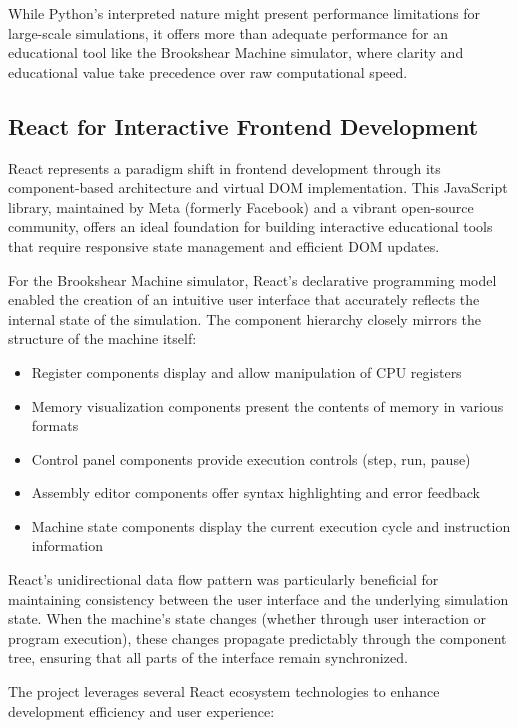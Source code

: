 While Python's interpreted nature might present performance limitations for large-scale simulations, it offers more than adequate performance for an educational tool like the Brookshear Machine simulator, where clarity and educational value take precedence over raw computational speed.

\subsection{\textbf{React for Interactive Frontend Development}}

React represents a paradigm shift in frontend development through its component-based architecture and virtual DOM implementation. This JavaScript library, maintained by Meta (formerly Facebook) and a vibrant open-source community, offers an ideal foundation for building interactive educational tools that require responsive state management and efficient DOM updates.

For the Brookshear Machine simulator, React's declarative programming model enabled the creation of an intuitive user interface that accurately reflects the internal state of the simulation. The component hierarchy closely mirrors the structure of the machine itself:

\begin{itemize}
    \item Register components display and allow manipulation of CPU registers
    \item Memory visualization components present the contents of memory in various formats
    \item Control panel components provide execution controls (step, run, pause)
    \item Assembly editor components offer syntax highlighting and error feedback
    \item Machine state components display the current execution cycle and instruction information
\end{itemize}

React's unidirectional data flow pattern was particularly beneficial for maintaining consistency between the user interface and the underlying simulation state. When the machine's state changes (whether through user interaction or program execution), these changes propagate predictably through the component tree, ensuring that all parts of the interface remain synchronized.

The project leverages several React ecosystem technologies to enhance development efficiency and user experience:

